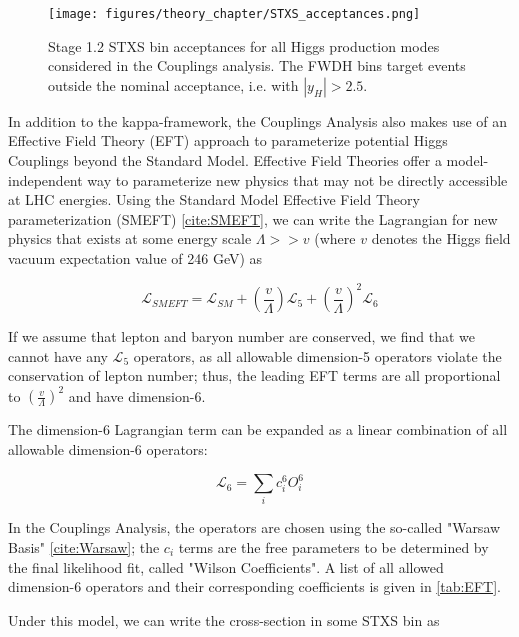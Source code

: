 \begin{figure}[tbp]
        \centering
        \texttt{[image: figures/theory\_chapter/STXS\_acceptances.png]}
        \caption{Stage 1.2 STXS bin acceptances for all Higgs production modes considered in the Couplings analysis. The FWDH bins target events outside the nominal acceptance, i.e. with $|y_{H}|>2.5$.}
        \label{fig:STXS_acceptances}
\end{figure}

In addition to the kappa-framework, the Couplings Analysis also makes use of an Effective Field Theory (EFT) approach to parameterize potential Higgs Couplings beyond the Standard Model. Effective Field Theories offer a model-independent way to parameterize new physics that may not be directly accessible at LHC energies. Using the Standard Model Effective Field Theory parameterization (SMEFT) \ref{cite:SMEFT}, we can write the Lagrangian for new physics that exists at some energy scale $\Lambda >> v$ (where $v$ denotes the Higgs field vacuum expectation value of 246 GeV) as

\begin{equation}
\mathcal{L}_{SMEFT} = \mathcal{L}_{SM} + (\frac{v}{\Lambda})\mathcal{L}_{5} + (\frac{v}{\Lambda})^2 \mathcal{L}_{6}
\end{equation}

If we assume that lepton and baryon number are conserved, we find that we cannot have any $\mathcal{L}_{5}$ operators, as all allowable dimension-5 operators violate the conservation of lepton number; thus, the leading EFT terms are all proportional to $(\frac{v}{\Lambda})^2$ and have dimension-6.

The dimension-6 Lagrangian term can be expanded as a linear combination of all allowable dimension-6 operators:

\begin{equation}
\mathcal{L}_{6} = \sum_{i} c_{i}^6 O_{i}^{6}
\end{equation}

In the Couplings Analysis, the operators are chosen using the so-called "Warsaw Basis" \ref{cite:Warsaw}; the $c_{i}$ terms are the free parameters to be determined by the final likelihood fit, called "Wilson Coefficients". A list of all allowed dimension-6 operators and their corresponding coefficients is given in \ref{tab:EFT}.






Under this model, we can write the cross-section in some STXS bin as 

